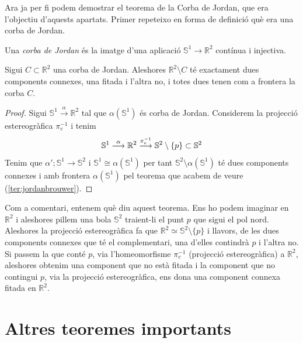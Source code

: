 \documentclass[../main.tex]{subfiles}
\begin{document}
Ara ja per fi podem demostrar el teorema de la Corba de Jordan, que era l'objectiu d'aquests apartats. Primer repeteixo en forma de definició què era una corba de Jordan.

\begin{defi}
 Una \textit{corba de Jordan} és la imatge d'una aplicació $\mathbb{S}^1\rightarrow \mathbb{R}^2$ contínua i injectiva.
\end{defi}

\begin{ter}
 Sigui $C\subset\mathbb{R}^2$ una corba de Jordan. Aleshores $\mathbb{R}^2\setminus C$ té exactament dues components connexes, una fitada i l'altra no, i totes dues tenen com a frontera la corba $C$.
\end{ter}
\begin{proof}
Sigui $\mathbb{S}^1\overset{\alpha}{\longrightarrow}\mathbb{R}^2$ tal que $\alpha(\mathbb{S}^1)$ és corba de Jordan. Considerem la projecció estereogràfica $\pi_e^{-1}$ i tenim
\begin{equation}
    \notag
    \mathbb{S}^1\overset{\alpha}{\longrightarrow}\mathbb{R}^2\overset{\pi_e^{-1}}{\longrightarrow}\mathbb{S}^2\setminus\{p\}\subset\mathbb{S}^2
\end{equation}
Tenim que $\alpha';\mathbb{S}^1\rightarrow\mathbb{S}^2$ i $\mathbb{S}^1\cong\alpha(\mathbb{S}^1)$ per tant $\mathbb{S}^2\setminus\alpha(\mathbb{S}^1)$ té dues components connexes i amb frontera $\alpha(\mathbb{S}^1)$ pel teorema que acabem de veure (\ref{ter:jordanbrouwer}). 
\end{proof}

Com a comentari, entenem què diu aquest teorema. Ens ho podem imaginar en $\mathbb{R}^2$ i aleshores pillem una bola $\mathbb{S}^2$ traient-li el punt $p$ que sigui el pol nord. Aleshores la projecció estereogràfica fa que $\mathbb{R}^2\simeq \mathbb{S}^2\setminus\{p\}$ i llavors, de les dues components connexes que té el complementari, una d'elles contindrà $p$ i l'altra no. Si passem la que conté $p$, via l'homeomorfisme $\pi_e^{-1}$ (projecció estereogràfica) a $\mathbb{R}^2$, aleshores obtenim una component que no està fitada i la component que no contingui $p$, via la projecció estereogràfica, ens dona una component connexa fitada en $\mathbb{R}^2$. 




\section{Altres teoremes importants}
\end{document}
